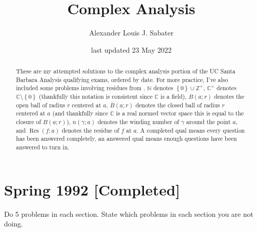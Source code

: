 \documentclass[12pt]{article}
\newcommand{\n}{\mathbb{N}}
\newcommand{\z}{\mathbb{Z}}
\newcommand{\cx}{\mathbb{C}}
\newcommand\setb[1]{\left \{ #1 \right \}}
\theoremstyle{definition}
\DeclareMathOperator\Res{Res}
\begin{document}
\date{last updated 23 May 2022} 
\author{Alexander Louis J. Sabater}
\title{Complex Analysis}
\maketitle
\newpage 
\tableofcontents
\newpage
\begin{abstract}
    These are my attempted solutions to the complex analysis portion of the UC Santa Barbara Analysis qualifying exams, ordered by date. For more practice, I've also included some problems involving residues from \cite{Conway}. $\n$ denotes $\setb{ 0 } \cup \z^+$, $\cx^{\times}$ denotes $\cx \setminus \setb{ 0 }$ (thankfully this notation is consistent since $\cx$ is a field), $B(a;r)$ denotes the open ball of radius $r$ centered at $a$, $\bar{B}(a;r)$ denotes the closed ball of radius $r$ centered at $a$ (and thankfully since $\cx$ is a real normed vector space this is equal to the closure of $B(a;r)$), $n(\gamma;a)$ denotes the winding number of $\gamma$ around the point $a$, and $\Res(f;a)$ denotes the residue of $f$ at $a$. A completed qual means every question has been answered completely, an answered qual means enough questions have been answered to turn in.
\end{abstract}
\section{Spring 1992 [Completed]}
Do 5 problems in each section. State which problems in each section you are not doing.
\end{document}
